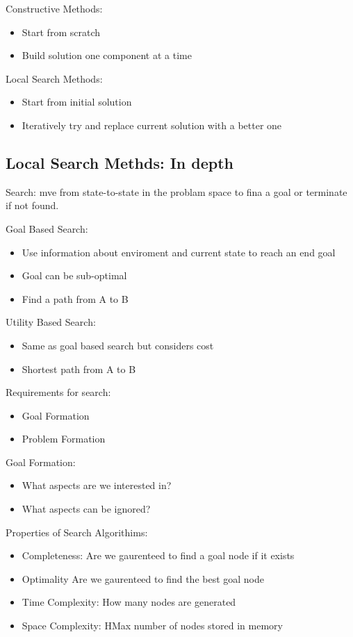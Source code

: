 \documentclass{article}
\begin{document}
    Constructive Methods:
    \begin{itemize}
        \item Start from scratch
        \item Build solution one component at a time
    \end{itemize}
    Local Search Methods:
    \begin{itemize}
        \item Start from initial solution
        \item Iteratively try and replace current solution with a better one
    \end{itemize}
\subsection{Local Search Methds: In depth}
    Search: mve from state-to-state in the problam space to fina a goal or terminate if not found.

    Goal Based Search:
    \begin{itemize}
        \item Use information about enviroment and current state to reach an end goal
        \item Goal can be sub-optimal
        \item Find a path from A to B
    \end{itemize}
    Utility Based Search:
    \begin{itemize}
        \item Same as goal based search but considers cost
        \item Shortest path from A to B
    \end{itemize}

    Requirements for search:
    \begin{itemize}
        \item Goal Formation
        \item Problem Formation
    \end{itemize}

    Goal Formation:
    \begin{itemize}
        \item What aspects are we interested in?
        \item What aspects can be ignored?
    \end{itemize}

    Properties of Search Algorithims:
    \begin{itemize}
        \item Completeness: Are we gaurenteed to find a goal node if it exists
        \item Optimality Are we gaurenteed to find the best goal node
        \item Time Complexity: How many nodes are generated
        \item Space Complexity: HMax number of nodes stored in memory
    \end{itemize}
\end{document}
